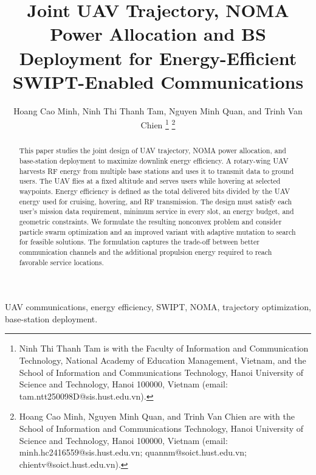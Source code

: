 \documentclass[conference]{IEEEtran}
\begin{document}
\title{Joint UAV Trajectory, NOMA Power Allocation and BS Deployment for Energy-Efficient SWIPT-Enabled Communications}
\author{Hoang Cao Minh, Ninh Thi Thanh Tam, Nguyen Minh Quan, and Trinh Van Chien
\thanks{Ninh Thi Thanh Tam is with the Faculty of Information and Communication Technology, National Academy of Education Management, Vietnam, and the School of Information and Communications Technology, Hanoi University of Science and Technology, Hanoi 100000, Vietnam (email: tam.ntt250098D@sis.hust.edu.vn).}
\thanks{Hoang Cao Minh, Nguyen Minh Quan, and Trinh Van Chien are with the School of Information and Communications Technology, Hanoi University of Science and Technology, Hanoi 100000, Vietnam (email: minh.hc2416559@sis.hust.edu.vn; quannm@soict.hust.edu.vn; chientv@soict.hust.edu.vn).}}
\maketitle
\thispagestyle{plain}


\begin{abstract}
This paper studies the joint design of UAV trajectory, NOMA power allocation, and base-station deployment to maximize downlink energy efficiency. A rotary-wing UAV harvests RF energy from multiple base stations and uses it to transmit data to ground users. The UAV flies at a fixed altitude and serves users while hovering at selected waypoints. Energy efficiency is defined as the total delivered bits divided by the UAV energy used for cruising, hovering, and RF transmission. The design must satisfy each user's mission data requirement, minimum service in every slot, an energy budget, and geometric constraints. We formulate the resulting nonconvex problem and consider particle swarm optimization and an improved variant with adaptive mutation to search for feasible solutions. The formulation captures the trade-off between better communication channels and the additional propulsion energy required to reach favorable service locations.
\end{abstract}
\begin{IEEEkeywords}
UAV communications, energy efficiency, SWIPT, NOMA, trajectory optimization, base-station deployment.
\end{IEEEkeywords}
\end{document}
